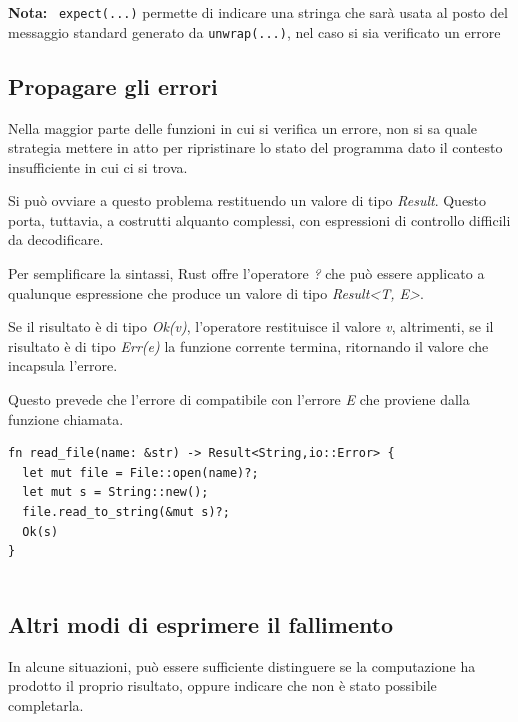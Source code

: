 \noindent
\begin{tcolorbox}
  \textbf{Nota:} \ \texttt{expect(...)}  permette di indicare una
  stringa che sarà usata al posto del messaggio standard generato da \texttt{unwrap(...)},
  nel caso si sia verificato un errore
\end{tcolorbox}



\subsection{Propagare gli errori}
Nella maggior parte delle funzioni in cui si verifica un errore, non si sa quale
strategia mettere in atto per ripristinare lo stato del programma dato il contesto
insufficiente in cui ci si trova.



Si può ovviare a questo problema restituendo un valore di tipo \textit{Result}.
Questo porta, tuttavia, a costrutti alquanto complessi, con espressioni di
controllo difficili da decodificare.




Per semplificare la sintassi, Rust offre l'operatore \textit{?} che può essere
applicato a qualunque espressione che produce un valore di tipo \textit{Result<T, E>}.

Se il risultato è di tipo \textit{Ok(v)}, l'operatore restituisce il valore \textit{v},
altrimenti, se il risultato è di tipo \textit{Err(e)} la funzione corrente
termina, ritornando il valore che incapsula l'errore.

Questo prevede che l'errore di compatibile con l'errore \textit{E} che proviene
dalla funzione chiamata.


\begin{verbatim}
fn read_file(name: &str) -> Result<String,io::Error> {
  let mut file = File::open(name)?;
  let mut s = String::new();
  file.read_to_string(&mut s)?;
  Ok(s)
}


\end{verbatim}

\subsection{Altri modi di esprimere il fallimento}
In alcune situazioni, può essere sufficiente distinguere se la computazione ha
prodotto il proprio risultato, oppure indicare che non è stato possibile
completarla.


